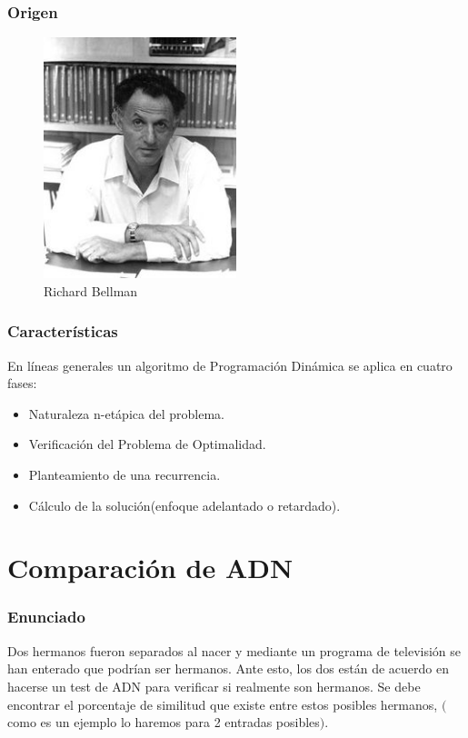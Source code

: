 \documentclass[13pt]{beamer}
\begin{document}
    \begin{frame}
		\frametitle{Origen}
            \begin{figure}[H] 
                \centering
                \includegraphics[width=0.5\textwidth]{bellman.jpg}
                \caption{Richard Bellman}
            \end{figure}
    \end{frame}

	\begin{frame}
		\frametitle{Características}
        En líneas generales un algoritmo de Programación Dinámica se aplica en cuatro fases:
        \begin{itemize}
        \item Naturaleza n-etápica del problema.
        \item Verificación del Problema de Optimalidad.
        \item Planteamiento de una recurrencia.
        \item Cálculo de la solución(enfoque adelantado o retardado). 
        \end{itemize}
	\end{frame}

	\section{Comparación de ADN}

    \begin{frame}
        \frametitle{Enunciado}
        Dos hermanos fueron separados al nacer y mediante un programa de televisión se han
        enterado que podrían ser hermanos. Ante esto, los dos están de acuerdo en hacerse un test de
        ADN para verificar si realmente son hermanos. Se debe encontrar el porcentaje de similitud que existe 
        entre estos posibles hermanos, $($como es un ejemplo lo haremos para 2 entradas posibles$)$.
    \end{frame}
\end{document}

